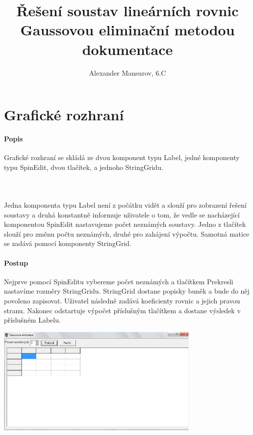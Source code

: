 \documentclass[10pt]{report}
\begin{document}
\title{\v{R}e\v{s}en\'i soustav line\'arn\'ich rovnic\\ Gaussovou elimina\v{c}n\'i metodou\\ dokumentace}
\author{Alexander Mansurov, 6.C}
\maketitle
\section{Grafick\'e rozhran\'i}
\paragraph{Popis}Grafick\'e rozhran\'i se skl\'ad\'a ze dvou komponent typu Label, jedn\'e komponenty typu SpinEdit, dvou tla\v{c}\'itek, a jednoho StringGridu.
\paragraph{~}Jedna komponenta typu Label nen\'i z po\v{c}\'atku vid\v{e}t a slou\v{z}\'i pro zobrazen\'i \v{r}e\v{s}en\'i soustavy a druh\'a konstantn\v{e} informuje u\v{z}ivatele o tom, \v{z}e vedle se nach\'azej\'ic\'i komponentou SpinEdit nastavujeme po\v{c}et nezn\'am\'ych soustavy.
Jedno z tla\v{c}\'itek slou\v{z}\'i pro zm\v{e}nu po\v{c}tu nezn\'am\'ych, druh\'e pro zah\'ajen\'i v\'ypo\v{c}tu. Samotn\'a matice se zad\'av\'a pomoc\'i komponenty StringGrid.
\paragraph{Postup}Nejprve pomoc\'i SpinEditu vybereme po\v{c}et nezn\'am\'ych a tla\v{c}\'itkem Prekresli nastav\'ime rozm\v{e}ry StringGridu. StringGrid dostane popisky bun\v{e}k a bude do n\v{e}j povoleno zapisovat. U\v{z}ivatel n\'asledn\v{e} zad\'av\'a koeficienty rovnic a jejich pravou stranu. Nakonec odstartuje v\'ypo\v{c}et p\v{r}\'islu\v{s}n\'ym tla\v{c}\'itkem a dostane v\'ysledek v p\v{r}\'islu\v{s}n\'em Labelu.\begin{center}
\includegraphics[width=10cm]{ge.jpg}
\end{center}
\end{document}
